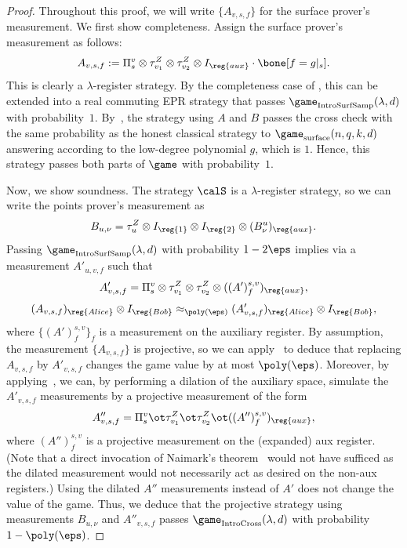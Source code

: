 \begin{proof}
Throughout this proof, we will write $\{A_{v, s, f}\}$ for the surface prover's measurement.
We first show completeness.
Assign the surface prover's measurement as follows:
\begin{equation*}
A_{v,s, f}  := \Pi^{v}_s \otimes \tau^Z_{v_1} \otimes \tau^Z_{v_2} \otimes I_{\reg{aux}} \cdot \bone[f = g|_{s}].
\end{equation*}
This is clearly a $\lambda$-register strategy. By the completeness
case of , this can be extended into a real
commuting EPR strategy that passes $\game_{\mathrm{IntroSurfSamp}}(\lambda, d)$ with
probability~$1$. By~, the strategy using $A$
and $B$ passes the cross check with the same probability as the
honest classical strategy to $\game_{\mathrm{surface}}(n, q, k, d)$ answering according
to the low-degree polynomial $g$, which is $1$. Hence, this strategy
passes both parts of $\game$ with probability~$1$.

Now, we show soundness.
The strategy $\calS$ is a $\lambda$-register strategy, so we can write the points prover's measurement as
\begin{equation*}
B_{u, \nu} = \tau^Z_u \otimes I_{\reg{1}} \otimes I_{\reg{2}} \otimes (B^u_{\nu})_{\reg{aux}}.
\end{equation*}
Passing $\game_{\mathrm{IntroSurfSamp}}(\lambda, d)$ with probability $1-2\eps$
implies via  a measurement $A'_{u, v, f}$ such that
\begin{equation*}
A'_{ v,s, f} = \Pi^{v}_s \otimes \tau^Z_{v_1} \otimes \tau^Z_{v_2} \otimes ((A')^{s, v}_f)_{\reg{aux}},
\end{equation*}
\begin{equation*}
(A_{v, s, f})_{\reg{Alice}} \otimes I_{\reg{Bob}}
\approx_{\poly(\eps)}  (A'_{v, s, f})_{\reg{Alice}} \otimes I_{\reg{Bob}},
\end{equation*}
where $\{(A')^{s,v}_f\}_{f}$ is a measurement on the auxiliary
register. By assumption, the measurement $\{A_{v,s,f}\}$ is
projective, so
we can apply~ to deduce
that replacing $A_{v,s,f}$ by $A'_{v,s,f}$ changes the game value by
at most $\poly(\eps)$. Moreover, by applying~, we can, by
performing a dilation of the auxiliary space, simulate the
$A'_{v,s,f}$ measurements by a projective measurement of the form
\[ A''_{v,s,f} = \Pi^v_s \ot \tau^Z_{v_1} \ot \tau^Z_{v_2} \ot
  ((A'')^{s,v}_f)_{\reg{aux}}, \]
where $(A'')^{s,v}_f$ is a projective measurement on the (expanded)
aux register. (Note that a direct invocation of Naimark's
theorem~ would not have sufficed as the dilated
measurement would not necessarily act as desired on the non-aux
registers.) Using the dilated $A''$ measurements instead of $A'$ does
not change the value of the game. Thus, we deduce that the projective strategy
using measurements $B_{u,\nu}$ and $A''_{v,s,f}$ passes
$\game_{\mathrm{IntroCross}}(\lambda, d)$ with probability
$1-\poly(\eps)$.


\end{proof}
